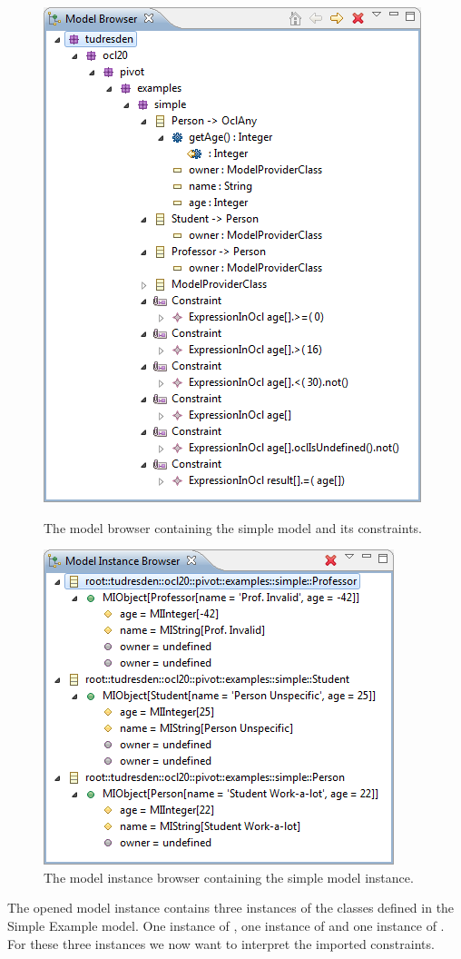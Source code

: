 \begin{figure}[!p]
	\centering
	\includegraphics[width=0.6\linewidth]{figures/interpreter/prepare01}
	\caption{The model browser containing the simple model and its constraints.}
	\label{pic:interpret:prepare01}

  \vspace{4.0em}
  
	\centering
	\includegraphics[width=0.6\linewidth]{figures/interpreter/prepare02}
	\caption{The model instance browser containing the simple model instance.}
	\label{pic:interpret:prepare02}
\end{figure}

The opened model instance contains three instances of the classes defined in the Simple Example model. One instance of , one instance of  and one instance of . For these three instances we now want to interpret the imported constraints.



